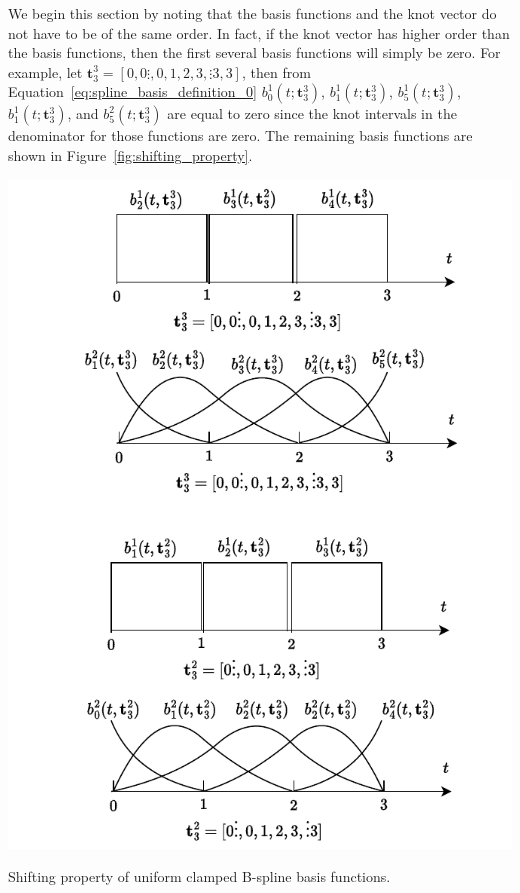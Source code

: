 We begin this section by noting that the basis functions and the knot vector do not have to be of the same order.  In fact, if the knot vector has higher order than the basis functions, then the first several basis functions will simply be zero.  
For example, let $\mathbf{t}_3^3 = [0, 0\vdots, 0, 1, 2, 3, \vdots 3, 3]$, then from Equation~\eqref{eq:spline_basis_definition_0} $b_0^1(t; \mathbf{t}_3^3)$, $b_1^1(t; \mathbf{t}_3^3)$, $b_5^1(t; \mathbf{t}_3^3)$, $b_1^1(t; \mathbf{t}_3^3)$, and $b_5^2(t; \mathbf{t}_3^3)$ are equal to zero since the knot intervals in the denominator for those functions are zero.  The remaining basis functions are shown in Figure~\ref{fig:shifting_property}.
\begin{marginfigure}[0in]
  \includegraphics[width=\linewidth]{./chap5_trajectory_planning/figures/shifting_property}
  \caption{Shifting property of uniform clamped B-spline basis functions.}
  \label{fig:shifting_property}  
\end{marginfigure}
